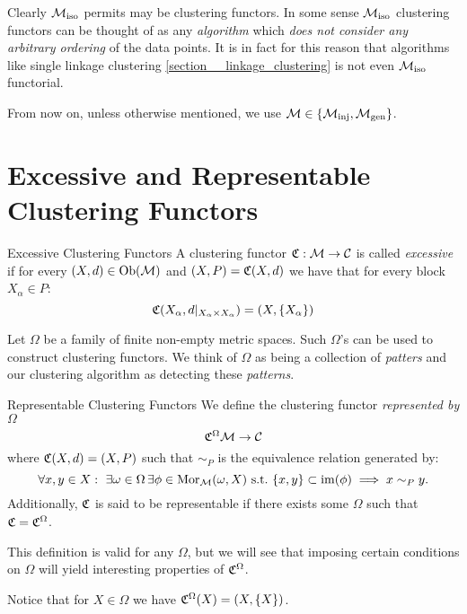 Clearly ${\mathcal{M}_\mathrm{iso}}$ permits may be clustering functors.
In some sense ${\mathcal{M}_\mathrm{iso}}$ clustering functors can be thought of as any \emph{algorithm} which \emph{does not consider any arbitrary ordering} of the data points.
It is in fact for this reason that algorithms like single linkage clustering \ref{section__linkage_clustering} is not even ${\mathcal{M}_\mathrm{iso}}$ functorial.

From now on, unless otherwise mentioned, we use $\mathcal{M} \in \{{\mathcal{M}_\mathrm{inj}}, {\mathcal{M}_\mathrm{gen}}\}$.

\section{Excessive and Representable Clustering Functors}
\begin{definition}{Excessive Clustering Functors \cite{Carlsson2010}}{}
A clustering functor $\mathfrak{C}: \mathcal{M} \to \mathcal{C}$ is called \emph{excessive} if for every $(X,d) \in \mathrm {Ob}(\mathcal{M})$ and $(X,P) = \mathfrak{C}(X,d)$ we have that for every block $X_\alpha \in P$:
$$
\mathfrak{C}(X_\alpha, d|_{X_\alpha \times X_\alpha}) = (X, \{X_\alpha\})
$$
\end{definition}

Let $\Omega$ be a family of finite non-empty metric spaces. Such $\Omega$'s can be used to construct clustering functors. We think of $\Omega$ as being a collection of \emph{patters} and our clustering algorithm as detecting these \emph{patterns}.



\begin{definition}{Representable Clustering Functors \cite{Carlsson2010}}{}
We define the clustering functor \emph{represented by $\Omega$}
$$
\mathfrak{C}^\Omega \mathcal{M} \to \mathcal{C}
$$
where $\mathfrak{C}(X,d) = (X, P)$ such that $\sim_P$ 
is the equivalence relation generated by:
\begin{equation*}
    \forall x,y \in X: \ \exists \omega \in \Omega \,\exists \phi \in \mathrm {Mor}_{\mathcal{M}}(\omega, X) \ \text{s.t.} \ \{x,y\} \subset \operatorname*{im}(\phi) \implies x \sim_P y.
\end{equation*}
Additionally, $\mathfrak{C}$ is said to be representable if there exists some $\Omega$ such that $\mathfrak{C} = \mathfrak{C}^\Omega$.
\end{definition}

This definition is valid for any $\Omega$, but we will see that imposing certain conditions on $\Omega$ will yield interesting properties of $\mathfrak{C}^\Omega$.

\begin{myremark}{}{}
Notice that for $X \in \Omega$ we have $\mathfrak{C}^\Omega(X) = (X, \{X\})$.
\end{myremark}

